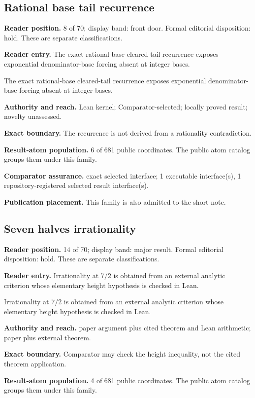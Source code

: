 \documentclass[11pt]{article}
\begin{document}
\subsection{Rational base tail recurrence}
\textbf{Reader position.} 8 of 70; display band: front door.  Formal editorial disposition: hold.  These are separate classifications.

\textbf{Reader entry.} The exact rational-base cleared-tail recurrence exposes exponential denominator-base forcing absent at integer bases.

The exact rational-base cleared-tail recurrence exposes exponential denominator-base forcing absent at integer bases.

\textbf{Authority and reach.} Lean kernel; Comparator-selected; locally proved result; novelty unassessed.

\textbf{Exact boundary.} The recurrence is not derived from a rationality contradiction.

\textbf{Result-atom population.} 6 of 681 public coordinates. The public atom catalog groups them under this family.

\textbf{Comparator assurance.} exact selected interface; 1 executable interface(s), 1 repository-registered selected result interface(s).

\textbf{Publication placement.} This family is also admitted to the short note.

\subsection{Seven halves irrationality}
\textbf{Reader position.} 14 of 70; display band: major result.  Formal editorial disposition: hold.  These are separate classifications.

\textbf{Reader entry.} Irrationality at 7/2 is obtained from an external analytic criterion whose elementary height hypothesis is checked in Lean.

Irrationality at 7/2 is obtained from an external analytic criterion whose elementary height hypothesis is checked in Lean.

\textbf{Authority and reach.} paper argument plus cited theorem and Lean arithmetic; paper plus external theorem.

\textbf{Exact boundary.} Comparator may check the height inequality, not the cited theorem application.

\textbf{Result-atom population.} 4 of 681 public coordinates. The public atom catalog groups them under this family.
\end{document}
